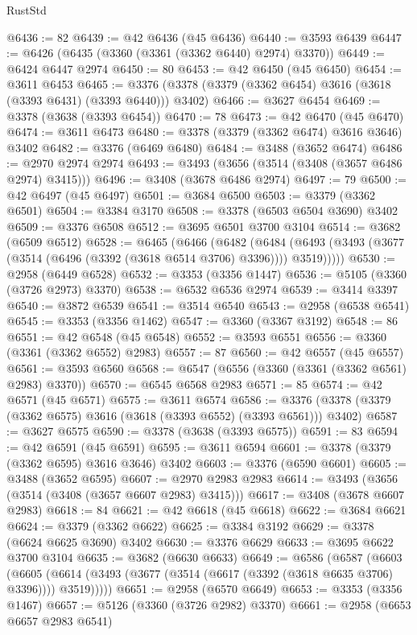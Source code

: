 \begin{lexlean}{RustStd}
\begin{coremodule}
@6436 := 82
@6439 := @42 @6436 (@45 @6436)
@6440 := @3593 @6439
@6447 := @6426 (@6435 (@3360 (@3361 (@3362 @6440) @2974) @3370))
@6449 := @6424 @6447 @2974
@6450 := 80
@6453 := @42 @6450 (@45 @6450)
@6454 := @3611 @6453
@6465 := @3376 (@3378 (@3379 (@3362 @6454) @3616 (@3618 (@3393 @6431) (@3393 @6440))) @3402)
@6466 := @3627 @6454
@6469 := @3378 (@3638 (@3393 @6454))
@6470 := 78
@6473 := @42 @6470 (@45 @6470)
@6474 := @3611 @6473
@6480 := @3378 (@3379 (@3362 @6474) @3616 @3646) @3402
@6482 := @3376 (@6469 @6480)
@6484 := @3488 (@3652 @6474)
@6486 := @2970 @2974 @2974
@6493 := @3493 (@3656 (@3514 (@3408 (@3657 @6486 @2974) @3415)))
@6496 := @3408 (@3678 @6486 @2974)
@6497 := 79
@6500 := @42 @6497 (@45 @6497)
@6501 := @3684 @6500
@6503 := @3379 (@3362 @6501)
@6504 := @3384 @3170
@6508 := @3378 (@6503 @6504 @3690) @3402
@6509 := @3376 @6508
@6512 := @3695 @6501 @3700 @3104
@6514 := @3682 (@6509 @6512)
@6528 := @6465
    (@6466
      (@6482
        (@6484 (@6493 (@3493 (@3677 (@3514 (@6496 (@3392 (@3618 @6514 @3706) @3396)))) @3519)))))
@6530 := @2958 (@6449 @6528)
@6532 := @3353 (@3356 @1447)
@6536 := @5105 (@3360 (@3726 @2973) @3370)
@6538 := @6532 @6536 @2974
@6539 := @3414 @3397
@6540 := @3872 @6539
@6541 := @3514 @6540
@6543 := @2958 (@6538 @6541)
@6545 := @3353 (@3356 @1462)
@6547 := @3360 (@3367 @3192)
@6548 := 86
@6551 := @42 @6548 (@45 @6548)
@6552 := @3593 @6551
@6556 := @3360 (@3361 (@3362 @6552) @2983)
@6557 := 87
@6560 := @42 @6557 (@45 @6557)
@6561 := @3593 @6560
@6568 := @6547 (@6556 (@3360 (@3361 (@3362 @6561) @2983) @3370))
@6570 := @6545 @6568 @2983
@6571 := 85
@6574 := @42 @6571 (@45 @6571)
@6575 := @3611 @6574
@6586 := @3376 (@3378 (@3379 (@3362 @6575) @3616 (@3618 (@3393 @6552) (@3393 @6561))) @3402)
@6587 := @3627 @6575
@6590 := @3378 (@3638 (@3393 @6575))
@6591 := 83
@6594 := @42 @6591 (@45 @6591)
@6595 := @3611 @6594
@6601 := @3378 (@3379 (@3362 @6595) @3616 @3646) @3402
@6603 := @3376 (@6590 @6601)
@6605 := @3488 (@3652 @6595)
@6607 := @2970 @2983 @2983
@6614 := @3493 (@3656 (@3514 (@3408 (@3657 @6607 @2983) @3415)))
@6617 := @3408 (@3678 @6607 @2983)
@6618 := 84
@6621 := @42 @6618 (@45 @6618)
@6622 := @3684 @6621
@6624 := @3379 (@3362 @6622)
@6625 := @3384 @3192
@6629 := @3378 (@6624 @6625 @3690) @3402
@6630 := @3376 @6629
@6633 := @3695 @6622 @3700 @3104
@6635 := @3682 (@6630 @6633)
@6649 := @6586
    (@6587
      (@6603
        (@6605 (@6614 (@3493 (@3677 (@3514 (@6617 (@3392 (@3618 @6635 @3706) @3396)))) @3519)))))
@6651 := @2958 (@6570 @6649)
@6653 := @3353 (@3356 @1467)
@6657 := @5126 (@3360 (@3726 @2982) @3370)
@6661 := @2958 (@6653 @6657 @2983 @6541)

\end{coremodule}
\end{lexlean}
